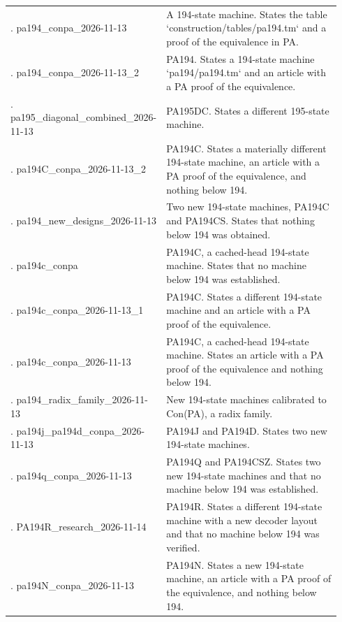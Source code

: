 {\begin{longtable}{@{}>{\raggedright\arraybackslash}p{0.34\linewidth}>{\raggedright\arraybackslash}p{0.60\linewidth}@{}}
34. pa194\_\allowbreak{}conpa\_\allowbreak{}2026-11-13 & A 194-state machine. States the table `construction/tables/pa194.tm` and a proof of the equivalence in PA.\\[5pt]
35. pa194\_\allowbreak{}conpa\_\allowbreak{}2026-11-13\_\allowbreak{}2 & PA194. States a 194-state machine `pa194/pa194.tm` and an article with a PA proof of the equivalence.\\[5pt]
36. pa195\_\allowbreak{}diagonal\_\allowbreak{}combined\_\allowbreak{}2026-11-13 & PA195DC. States a different 195-state machine.\\[5pt]
37. pa194C\_\allowbreak{}conpa\_\allowbreak{}2026-11-13\_\allowbreak{}2 & PA194C. States a materially different 194-state machine, an article with a PA proof of the equivalence, and nothing below 194.\\[5pt]
38. pa194\_\allowbreak{}new\_\allowbreak{}designs\_\allowbreak{}2026-11-13 & Two new 194-state machines, PA194C and PA194CS. States that nothing below 194 was obtained.\\[5pt]
39. pa194c\_\allowbreak{}conpa & PA194C, a cached-head 194-state machine. States that no machine below 194 was established.\\[5pt]
40. pa194c\_\allowbreak{}conpa\_\allowbreak{}2026-11-13\_\allowbreak{}1 & PA194C. States a different 194-state machine and an article with a PA proof of the equivalence.\\[5pt]
41. pa194c\_\allowbreak{}conpa\_\allowbreak{}2026-11-13 & PA194C, a cached-head 194-state machine. States an article with a PA proof of the equivalence and nothing below 194.\\[5pt]
42. pa194\_\allowbreak{}radix\_\allowbreak{}family\_\allowbreak{}2026-11-13 & New 194-state machines calibrated to Con(PA), a radix family.\\[5pt]
43. pa194j\_\allowbreak{}pa194d\_\allowbreak{}conpa\_\allowbreak{}2026-11-13 & PA194J and PA194D. States two new 194-state machines.\\[5pt]
44. pa194q\_\allowbreak{}conpa\_\allowbreak{}2026-11-13 & PA194Q and PA194CSZ. States two new 194-state machines and that no machine below 194 was established.\\[5pt]
45. PA194R\_\allowbreak{}research\_\allowbreak{}2026-11-14 & PA194R. States a different 194-state machine with a new decoder layout and that no machine below 194 was verified.\\[5pt]
46. pa194N\_\allowbreak{}conpa\_\allowbreak{}2026-11-13 & PA194N. States a new 194-state machine, an article with a PA proof of the equivalence, and nothing below 194.\\[5pt]

\end{longtable}}
